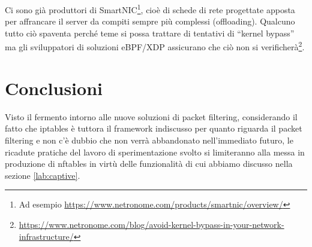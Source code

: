 Ci sono gi\`a produttori di SmartNIC\footnote{Ad esempio
    \url{https://www.netronome.com/products/smartnic/overview/}}, cio\`e di
    schede di rete progettate apposta per affrancare il server 
    da compiti sempre pi\`u complessi (offloading).  Qualcuno
    tutto ci\`o spaventa perch\'e teme si possa trattare di tentativi di
    ``kernel
    bypass'' ma gli sviluppatori di soluzioni eBPF/XDP assicurano che ci\`o
    non si
    verificher\`a\footnote{\url{https://www.netronome.com/blog/avoid-kernel-bypass-in-your-network-infrastructure/}}.

\section{Conclusioni}

Visto il fermento intorno alle nuove soluzioni di packet filtering,
considerando il fatto che iptables \`e tuttora il framework indiscusso per
quanto riguarda il packet filtering e non c'\`e dubbio che non verr\`a
abbandonato nell'immediato futuro, le ricadute pratiche del lavoro di
sperimentazione svolto si limiteranno alla messa in produzione di nftables in
virt\`u delle funzionalit\`a di cui abbiamo discusso nella sezione
\ref{lab:captive}.
